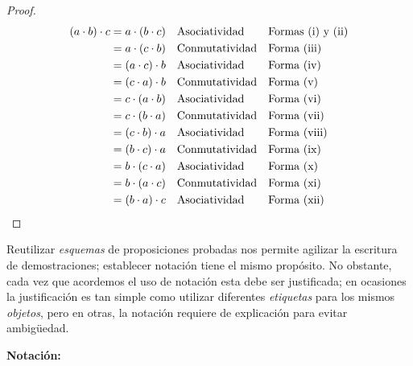 \documentclass[11pt]{article}
\begin{document}
\vspace{-1em}\begin{proof} \begin{align*}
    (a\cdot b)\cdot c &= a\cdot (b\cdot c) && \text{Asociatividad} && \text{Formas (i) y (ii)}\\
    &= a\cdot (c\cdot b) && \text{Conmutatividad} && \text{Forma (iii)}\\
    &= (a\cdot c)\cdot b && \text{Asociatividad} && \text{Forma (iv)}\\
    &= (c\cdot a)\cdot b && \text{Conmutatividad}&& \text{Forma (v)}\\
    &= c\cdot (a\cdot b) && \text{Asociatividad}&& \text{Forma (vi)}\\
    &= c\cdot (b\cdot a) && \text{Conmutatividad}&& \text{Forma (vii)}\\
    &= (c\cdot b)\cdot a && \text{Asociatividad}&& \text{Forma (viii)}\\
    &= (b\cdot c)\cdot a && \text{Conmutatividad}&& \text{Forma (ix)}\\
    &= b\cdot (c\cdot a) && \text{Asociatividad}&& \text{Forma (x)}\\
    &= b\cdot (a\cdot c) && \text{Conmutatividad}&& \text{Forma (xi)}\\
    &= (b\cdot a)\cdot c && \text{Asociatividad}&& \text{Forma (xii)} \qedhere
\end{align*} \end{proof} \vspace{-1em}

    Reutilizar \textit{esquemas} de proposiciones probadas nos permite agilizar la escritura de demostraciones; establecer notación tiene el mismo propósito. No obstante, cada vez que acordemos el uso de notación esta debe ser justificada; en ocasiones la justificación es tan simple como utilizar diferentes \textit{etiquetas} para los mismos \textit{objetos}, pero en otras, la notación requiere de explicación para evitar ambigüedad.

    \textbf{Notación:}
\end{document}
